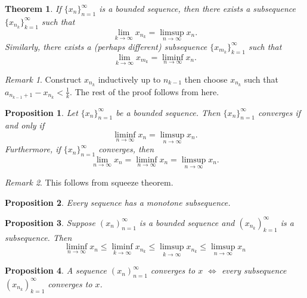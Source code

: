 \documentclass{article}
\newtheorem{theorem}{Theorem}[section]
\newtheorem{proposition}{Proposition}[section]
\theoremstyle{definition}
\theoremstyle{remark}
\newtheorem{remark}{Remark}[section]
\begin{document}
\begin{theorem}\label{thm: lim sup lim inf subsequence}
If \( \{x_n\}_{n=1}^{\infty} \) is a bounded sequence, then there exists a subsequence \( \{x_{n_k}\}_{k=1}^{\infty} \) such that
\[
\lim_{k \to \infty} x_{n_k} = \limsup_{n \to \infty} x_n.
\]
Similarly, there exists a (perhaps different) subsequence \( \{x_{m_k}\}_{k=1}^{\infty} \) such that
\[
\lim_{k \to \infty} x_{m_k} = \liminf_{n \to \infty} x_n.
\]
\end{theorem}

\begin{remark}
Construct $x_{n_k}$ inductively up to $n_{k-1}$ then choose $x_{n_k}$
such that $a_{n_{k-1}+1} - x_{n_k} < \frac{1}{k}$. The rest of the proof
follows from here. 
\end{remark}







\begin{proposition} \label{prp: convergence criterion lim inf lim sup}
Let \( \{x_n\}_{n=1}^{\infty} \) be a bounded sequence. Then \( \{x_n\}_{n=1}^{\infty} \) converges if and only if
\[
\liminf_{n \to \infty} x_n = \limsup_{n \to \infty} x_n.
\]
\textit{Furthermore, if} \( \{x_n\}_{n=1}^{\infty} \) \textit{converges, then}
\[
\lim_{n \to \infty} x_n = \liminf_{n \to \infty} x_n = \limsup_{n \to \infty} x_n.
\]
\end{proposition}


\begin{remark}
This follows from squeeze theorem. 
\end{remark}


\vspace{.5cm}




\begin{proposition}
Every sequence has a monotone subsequence.
\end{proposition}


\vspace{.5cm}


\begin{proposition}
Suppose $ (x_n)^\infty_{n=1}$ is a bounded sequence and $ (x_{n_k})^\infty_{k = 1}$ is a subsequence. Then
\[
\liminf_{n \to \infty} x_n \leq \liminf_{k \to \infty} x_{n_k} \leq \limsup_{k \to \infty} x_{n_k} \leq \limsup_{n \to \infty} x_n
\]
\end{proposition}


\begin{proposition}
A sequence $ (x_n)^\infty_{n=1}$ converges to $x$ $\iff$ every subsequence $ (x_{n_k})^\infty_{k = 1}$ converges to $x$.
\end{proposition}
\end{document}
